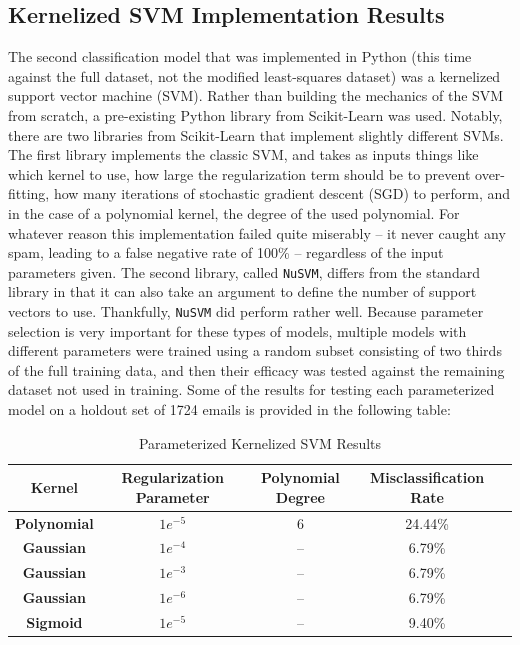 \documentclass{article}
\begin{document}
\subsection{Kernelized SVM Implementation Results}
The second classification model that was implemented in Python (this time against the full dataset, not the modified least-squares dataset) was a kernelized support vector machine (SVM). Rather than building the mechanics of the SVM from scratch, a pre-existing Python library from Scikit-Learn was used. Notably, there are two libraries from Scikit-Learn that implement slightly different SVMs. The first library implements the classic SVM, and takes as inputs things like which kernel to use, how large the regularization term should be to prevent over-fitting, how many iterations of stochastic gradient descent (SGD) to perform, and in the case of a polynomial kernel, the degree of the used polynomial. For whatever reason this implementation failed quite miserably -- it never caught any spam, leading to a false negative rate of 100\% --  regardless of the input parameters given. The second library, called \texttt{NuSVM}, differs from the standard library in that it can also take an argument to define the number of support vectors to use. Thankfully, \texttt{NuSVM} did perform rather well. Because parameter selection is very important for these types of models, multiple models with different parameters were trained using a random subset consisting of two thirds of the full training data, and then their efficacy was tested against the remaining dataset not used in training. Some of the results for testing each parameterized model on a holdout set of 1724 emails is provided in the following table:

\begin{table}[h!]
\begin{center}
\caption{Parameterized Kernelized SVM Results}
\hspace*{-1cm}\begin{tabular}{c|c|c|c|c}
\textbf{Kernel} & \textbf{Regularization Parameter} & \textbf{Polynomial Degree}& \textbf{Misclassification Rate} \\
\hline
\textbf{Polynomial} &   $1e^{-5}$   &   6 &  24.44\%  \\
\textbf{Gaussian} & $1e^{-4}$  & -- & 6.79\%   \\
\textbf{Gaussian} & $1e^{-3}$  & -- & 6.79\%   \\
\textbf{Gaussian} & $1e^{-6}$  & -- & 6.79\%   \\
\textbf{Sigmoid} & $1e^{-5}$  & -- & 9.40\%   \\
\end{tabular}
\end{center}
\end{table}
\end{document}
